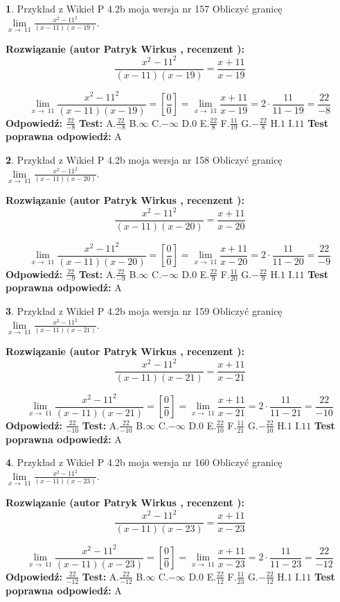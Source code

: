 \documentclass[12pt, a4paper]{article}
\theoremstyle{definition} %
\newtheorem{zad}{}
\newcommand{\zadStart}[1]{\begin{zad}#1\newline}
\newcommand{\zadStop}{\end{zad}}
\newcommand{\rozwStart}[2]{\noindent \textbf{Rozwiązanie (autor #1 , recenzent #2): }\newline}
\newcommand{\rozwStop}{\newline}
\newcommand{\odpStart}{\noindent \textbf{Odpowiedź:}\newline}
\newcommand{\odpStop}{\newline}
\newcommand{\testStart}{\noindent \textbf{Test:}\newline}
\newcommand{\testStop}{\newline}
\newcommand{\kluczStart}{\noindent \textbf{Test poprawna odpowiedź:}\newline}
\newcommand{\kluczStop}{\newline}
\begin{document}
\zadStart{Przykład z Wikieł P 4.2b moja wersja nr 157}
Obliczyć granicę $\lim\limits_{x\to\ 11}\frac{x^{2}-11^{2}}{(x-11)(x-19)}$.
\zadStop
\rozwStart{Patryk Wirkus}{}
$$\frac{x^{2}-11^{2}}{(x-11)(x-19)}=\frac{x+11}{x-19}$$

$$\lim\limits_{x\to\ 11}\frac{x^{2}-11^{2}}{(x-11)(x-19)}=[\frac{0}{0}]=\lim\limits_{x\to\ 11}\frac{x+11}{x-19}=2 \cdot \frac{11}{11-19} = \frac{22}{-8}$$
\rozwStop
\odpStart
$\frac{22}{-8}$
\odpStop
\testStart
A.$\frac{22}{-8}$
B.$\infty$
C.$-\infty$
D.$0$
E.$\frac{22}{8}$
F.$\frac{11}{19}$
G.$-\frac{22}{8}$
H.$1$
I.$11$
\testStop
\kluczStart
A
\kluczStop



\zadStart{Przykład z Wikieł P 4.2b moja wersja nr 158}
Obliczyć granicę $\lim\limits_{x\to\ 11}\frac{x^{2}-11^{2}}{(x-11)(x-20)}$.
\zadStop
\rozwStart{Patryk Wirkus}{}
$$\frac{x^{2}-11^{2}}{(x-11)(x-20)}=\frac{x+11}{x-20}$$

$$\lim\limits_{x\to\ 11}\frac{x^{2}-11^{2}}{(x-11)(x-20)}=[\frac{0}{0}]=\lim\limits_{x\to\ 11}\frac{x+11}{x-20}=2 \cdot \frac{11}{11-20} = \frac{22}{-9}$$
\rozwStop
\odpStart
$\frac{22}{-9}$
\odpStop
\testStart
A.$\frac{22}{-9}$
B.$\infty$
C.$-\infty$
D.$0$
E.$\frac{22}{9}$
F.$\frac{11}{20}$
G.$-\frac{22}{9}$
H.$1$
I.$11$
\testStop
\kluczStart
A
\kluczStop



\zadStart{Przykład z Wikieł P 4.2b moja wersja nr 159}
Obliczyć granicę $\lim\limits_{x\to\ 11}\frac{x^{2}-11^{2}}{(x-11)(x-21)}$.
\zadStop
\rozwStart{Patryk Wirkus}{}
$$\frac{x^{2}-11^{2}}{(x-11)(x-21)}=\frac{x+11}{x-21}$$

$$\lim\limits_{x\to\ 11}\frac{x^{2}-11^{2}}{(x-11)(x-21)}=[\frac{0}{0}]=\lim\limits_{x\to\ 11}\frac{x+11}{x-21}=2 \cdot \frac{11}{11-21} = \frac{22}{-10}$$
\rozwStop
\odpStart
$\frac{22}{-10}$
\odpStop
\testStart
A.$\frac{22}{-10}$
B.$\infty$
C.$-\infty$
D.$0$
E.$\frac{22}{10}$
F.$\frac{11}{21}$
G.$-\frac{22}{10}$
H.$1$
I.$11$
\testStop
\kluczStart
A
\kluczStop



\zadStart{Przykład z Wikieł P 4.2b moja wersja nr 160}
Obliczyć granicę $\lim\limits_{x\to\ 11}\frac{x^{2}-11^{2}}{(x-11)(x-23)}$.
\zadStop
\rozwStart{Patryk Wirkus}{}
$$\frac{x^{2}-11^{2}}{(x-11)(x-23)}=\frac{x+11}{x-23}$$

$$\lim\limits_{x\to\ 11}\frac{x^{2}-11^{2}}{(x-11)(x-23)}=[\frac{0}{0}]=\lim\limits_{x\to\ 11}\frac{x+11}{x-23}=2 \cdot \frac{11}{11-23} = \frac{22}{-12}$$
\rozwStop
\odpStart
$\frac{22}{-12}$
\odpStop
\testStart
A.$\frac{22}{-12}$
B.$\infty$
C.$-\infty$
D.$0$
E.$\frac{22}{12}$
F.$\frac{11}{23}$
G.$-\frac{22}{12}$
H.$1$
I.$11$
\testStop
\kluczStart
A
\kluczStop
\end{document}
